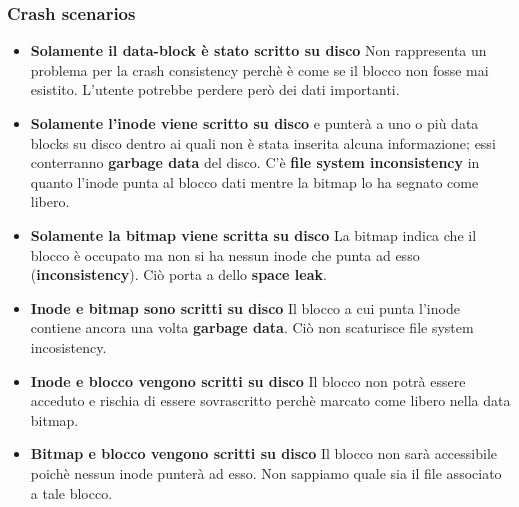 \documentclass[12pt, twoside, letterpaper]{article}
\begin{document}
			\subsubsection{Crash scenarios}
				\begin{itemize}
					\item \textbf{Solamente il data-block è stato scritto su disco} Non rappresenta un problema per la crash consistency perchè è come se il blocco non fosse mai esistito. L'utente potrebbe perdere però dei dati importanti.
					\item \textbf{Solamente l'inode viene scritto su disco} e punterà a uno o più data blocks su disco dentro ai quali non è stata inserita alcuna informazione; essi conterranno \textbf{garbage data} del disco. C'è \textbf{file system inconsistency} in quanto l'inode punta al blocco dati mentre la bitmap lo ha segnato come libero.
					\item \textbf{Solamente la bitmap viene scritta su disco} La bitmap indica che il blocco è occupato ma non si ha nessun inode che punta ad esso (\textbf{inconsistency}). Ciò porta a dello \textbf{space leak}.
					\item \textbf{Inode e bitmap sono scritti su disco} Il blocco a cui punta l'inode contiene ancora una volta \textbf{garbage data}. Ciò non scaturisce file system incosistency.
					\item \textbf{Inode e blocco vengono scritti su disco} Il blocco non potrà essere acceduto e rischia di essere sovrascritto perchè marcato come libero nella data bitmap.
					\item \textbf{Bitmap e blocco vengono scritti su disco} Il blocco non sarà accessibile poichè nessun inode punterà ad esso. Non sappiamo quale sia il file associato a tale blocco.
				\end{itemize}
				
\end{document}
